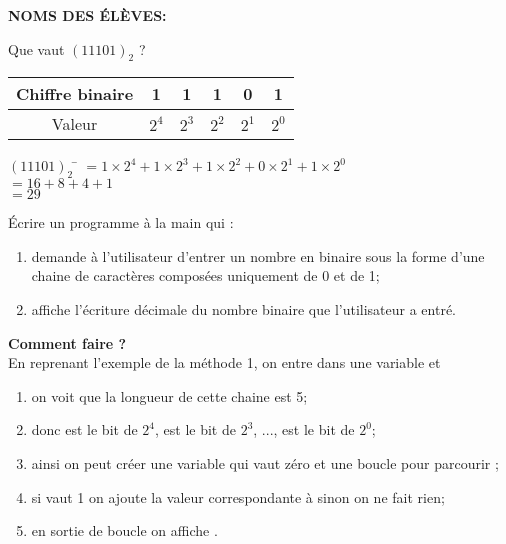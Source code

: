 \documentclass[a4paper,12pt,french]{book}
\begin{document}
\textbf{NOMS DES \'ELÈVES:}\\


\begin{methode}
Que vaut $(11101)_2$ ?
\begin{center}
	\begin{tabular}{|c|c|c|c|c|c|}
		\hline 
		Chiffre binaire & 1 & 1 & 1 & 0 & 1 \\ 
		\hline 
		Valeur & $2^4$ & $2^3$ & $2^2$ & $2^1$ & $2^0$ \\ 
		\hline 
	\end{tabular}
\end{center}
\begin{tabbing}
		$(11101)_2$	\= 	$=1\times 2^4+1\times 2^3+1\times 2^2+0\times 2^1+1\times 2^0$	\\
			\>	$=16+8+4+1$	\\	
			\>	$=29$	
	\end{tabbing}\nopagebreak
\end{methode}
\begin{exercice}[]
	\'Ecrire un programme à la main qui :
\begin{enumerate}[--]
	\item 	demande à l'utilisateur d'entrer un nombre en binaire sous la forme d'une chaine de caractères composées uniquement de 0 et de 1;
	\item 	affiche l'écriture décimale du nombre binaire que l'utilisateur a entré.\\
\end{enumerate}

\textbf{Comment faire ?}\\

En reprenant l'exemple de la méthode 1, on entre  dans une variable  et
\begin{enumerate}[--]
	\item 	on voit que la longueur de cette chaine est 5;
	\item 	donc  est le bit de $2^4$,  est le bit de $2^3$, ...,  est le bit de $2^0$;
	\item 	ainsi on peut créer une variable  qui vaut zéro et une boucle  pour parcourir ;
	\item 	si  vaut 1 on ajoute la valeur correspondante à  sinon on ne fait rien;
	\item 	en sortie de boucle on affiche .
\end{enumerate}
\end{exercice}
\end{document}
